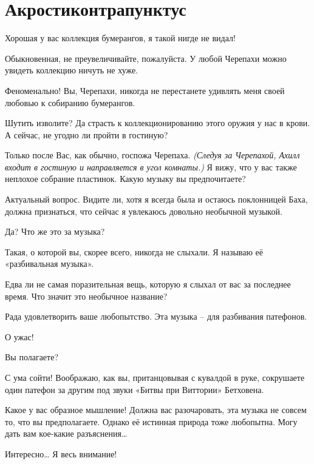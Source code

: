 \documentclass[../main.tex]{subfiles}
\begin{document}
\section{Акростиконтрапунктус}

\begin{dialogue}

 {\Large Х}орошая у вас коллекция бумерангов, я такой нигде не видал!

 Обыкновенная, не преувеличивайте, пожалуйста. У любой Черепахи можно увидеть коллекцию ничуть не хуже.

 Феноменально! Вы, Черепахи, никогда не перестанете удивлять меня своей любовью к собиранию бумерангов.

 Шутить изволите? Да страсть к коллекционированию этого оружия у нас в крови. А сейчас, не угодно ли пройти в гостиную?

 Только после Вас, как обычно, госпожа Черепаха. \emph{(Следуя за Черепахой, Ахилл входит в гостиную и направляется в угол комнаты.)} Я вижу, что у вас также неплохое собрание пластинок. Какую музыку вы предпочитаете?

 Актуальный вопрос. Видите ли, хотя я всегда была и остаюсь поклонницей Баха, должна признаться, что сейчас я увлекаюсь довольно необычной музыкой.

 Да? Что же это за музыка?

 Такая, о которой вы, скорее всего, никогда не слыхали. Я называю её «разбивальная музыка».

 Едва ли не самая поразительная вещь, которую я слыхал от вас за последнее время. Что значит это необычное название?

 Рада удовлетворить ваше любопытство. Эта музыка \--- для разбивания патефонов.

 О ужас!

 Вы полагаете?

 С ума сойти! Воображаю, как вы, пританцовывая с кувалдой в руке, сокрушаете один патефон за другим под звуки «Битвы при Виттории» Бетховена.

 Какое у вас образное мышление! Должна вас разочаровать, эта музыка не совсем то, что вы предполагаете. Однако её истинная природа тоже любопытна. Могу дать вам кое-какие разъяснения\ldots{}

 Интересно\ldots{} Я весь внимание!


\end{dialogue}
\end{document}
